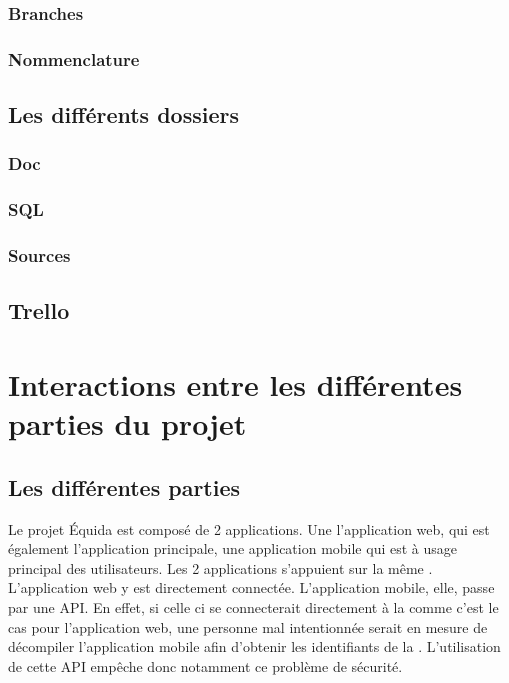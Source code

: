 			\subsubsection{Branches}

			\subsubsection{Nommenclature}

		\subsection{Les différents dossiers}
			\subsubsection{Doc}

			\subsubsection{SQL}

			\subsubsection{Sources}

		\subsection{Trello}

	\section{Interactions entre les différentes parties du projet}
		\subsection{Les différentes parties}
			Le projet Équida est composé de 2 applications. Une l'application web, qui est également l'application principale, une application mobile qui est à usage principal des utilisateurs. Les 2 applications s'appuient sur la même \bdd{}. L'application web y est directement connectée. L'application mobile, elle, passe par une API. En effet, si celle ci se connecterait directement à la \bdd{} comme c'est le cas pour l'application web, une personne mal intentionnée serait en mesure de décompiler l'application mobile afin d'obtenir les identifiants de la \bdd{}. L'utilisation de cette API empêche donc notamment ce problème de sécurité.

